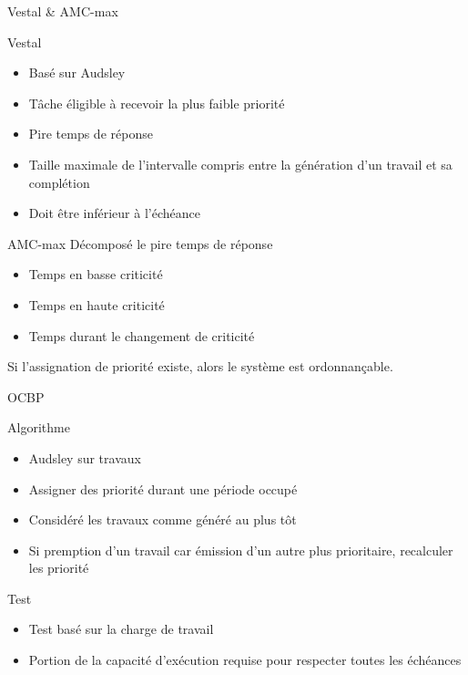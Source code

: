 \documentclass{bredelebeamer}
\begin{document}
\begin{frame}{Vestal \& AMC-max}
\begin{block}{Vestal}
\begin{itemize}
\item Basé sur Audsley
\item Tâche éligible à recevoir la plus faible priorité
\item Pire temps de réponse
\item Taille maximale de l'intervalle compris entre la génération d’un travail et sa complétion
\item Doit être inférieur à l'échéance
\end{itemize}
\end{block}

\begin{block}{AMC-max}
Décomposé le pire temps de réponse
\begin{itemize}
\item Temps en basse criticité
\item Temps en haute criticité
\item Temps durant le changement de criticité
\end{itemize}
\end{block}

Si l'assignation de priorité existe, alors le système est ordonnançable.

\end{frame}


\begin{frame}{OCBP}

\begin{block}{Algorithme}
\begin{itemize}
\item Audsley sur travaux
\item Assigner des priorité durant une période occupé
\item Considéré les travaux comme généré au plus tôt
\item Si premption d'un travail car émission d'un autre plus prioritaire, recalculer les priorité
\end{itemize}
\end{block}

\begin{block}{Test}
\begin{itemize}
\item Test basé sur la charge de travail
\item Portion de la capacité d’exécution requise pour respecter toutes les échéances
\end{itemize}
\end{block}

\end{frame}
\end{document}
